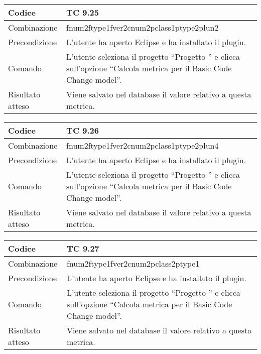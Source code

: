\begin{table}[ht]
\begin{tabular}{|p{3cm}|p{9cm}|}
\hline
\cellcolor{lightgray}Codice				& TC 9.25								\\
\hline
\cellcolor{lightgray}Combinazione		& fnum2ftype1fver2cnum2pclass1ptype2plun2									\\
\hline
\cellcolor{lightgray}Precondizione		& L'utente ha aperto Eclipse e ha installato il plugin.		\\
\hline
\cellcolor{lightgray}Comando			& L'utente seleziona il progetto ``Progetto ''  e clicca sull'opzione ``Calcola metrica per il Basic Code Change model''.	\\
\hline
\cellcolor{lightgray}Risultato atteso	& Viene salvato nel database il valore relativo a questa metrica.\\
\hline
\end{tabular}
\end{table}


\begin{table}[ht]
\begin{tabular}{|p{3cm}|p{9cm}|}
\hline
\cellcolor{lightgray}Codice				& TC 9.26								\\
\hline
\cellcolor{lightgray}Combinazione		& fnum2ftype1fver2cnum2pclass1ptype2plun4									\\
\hline
\cellcolor{lightgray}Precondizione		& L'utente ha aperto Eclipse e ha installato il plugin.		\\
\hline
\cellcolor{lightgray}Comando			& L'utente seleziona il progetto ``Progetto ''  e clicca sull'opzione ``Calcola metrica per il Basic Code Change model''.	\\
\hline
\cellcolor{lightgray}Risultato atteso	& Viene salvato nel database il valore relativo a questa metrica.\\
\hline
\end{tabular}
\end{table}


\begin{table}[ht]
\begin{tabular}{|p{3cm}|p{9cm}|}
\hline
\cellcolor{lightgray}Codice				& TC 9.27								\\
\hline
\cellcolor{lightgray}Combinazione		& fnum2ftype1fver2cnum2pclass2ptype1									\\
\hline
\cellcolor{lightgray}Precondizione		& L'utente ha aperto Eclipse e ha installato il plugin.		\\
\hline
\cellcolor{lightgray}Comando			& L'utente seleziona il progetto ``Progetto ''  e clicca sull'opzione ``Calcola metrica per il Basic Code Change model''.	\\
\hline
\cellcolor{lightgray}Risultato atteso	& Viene salvato nel database il valore relativo a questa metrica.\\
\hline
\end{tabular}
\end{table}

